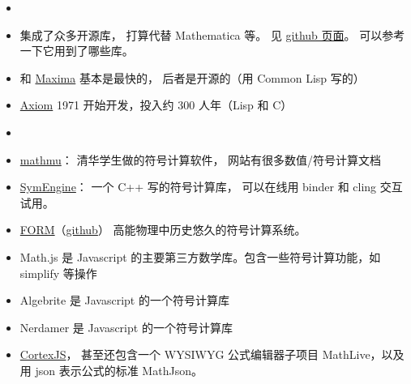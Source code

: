 
\begin{issues}
\issueDraft
\end{issues}

\begin{itemize}
\item {}
\item {} 集成了众多开源库， 打算代替 Mathematica 等。 见 \href{https://github.com/sagemath/sage/}{github 页面}。 可以参考一下它用到了哪些库。
\item  {} 和 \href{https://maxima.sourceforge.io/}{Maxima} 基本是最快的， 后者是开源的（用 Common Lisp 写的）
\item \href{http://www.axiom-developer.org/}{Axiom} 1971 开始开发，投入约 300 人年（Lisp 和 C）
\item {}
\item \href{http://mathmu.github.io/MTCAS/RecentChanges.html}{mathmu}： 清华学生做的符号计算软件， 网站有很多数值/符号计算文档
\item \href{https://github.com/symengine/symengine}{SymEngine}： 一个 C++ 写的符号计算库， 可以在线用 binder 和 cling 交互试用。
\item \href{https://www.nikhef.nl/~form/}{FORM}（\href{https://github.com/vermaseren/form}{github}） 高能物理中历史悠久的符号计算系统。
\item Math.js 是 Javascript 的主要第三方数学库。包含一些符号计算功能，如 simplify 等操作
\item Algebrite 是 Javascript 的一个符号计算库
\item Nerdamer 是 Javascript 的一个符号计算库
\item \href{https://cortexjs.io/}{CortexJS}， 甚至还包含一个 WYSIWYG 公式编辑器子项目 MathLive，以及用 json 表示公式的标准 MathJson。
\end{itemize}
